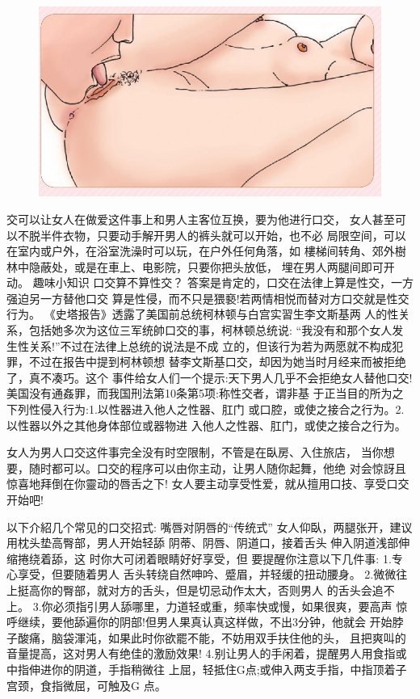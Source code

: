 \documentclass[12pt,UTF8]{ctexbook}
\begin{document}
\begin{figure}[htbp]
	\centering
	\includegraphics[width=0.7\linewidth]{19}
	\caption{}
	\label{fig:1}
\end{figure}

交可以让女人在做爱这件事上和男人主客位互换，要为他进行口交，
女人甚至可以不脱半件衣物，只要动手解开男人的裤头就可以开始，也不必
局限空间，可以在室内或户外，在浴室洗澡时可以玩，在户外任何角落，如
樓梯间转角、郊外樹林中隐蔽处，或是在車上、电影院，只要你把头放低，
埋在男人两腿间即可开动。
趣味小知识
口交算不算性交？
答案是肯定的，口交在法律上算是性交，一方强迫另一方替他口交
算是性侵，而不只是猥褻!若两情相悦而替对方口交就是性交行为。
《史塔报告》透露了美国前总统柯林顿与白宫实習生李文斯基两
人的性关系，包括她多次为这位三军统帥口交的事，柯林顿总统说:
“我没有和那个女人发生性关系!”不过在法律上总统的说法是不成
立的，但该行为若为两愿就不构成犯罪，不过在报告中提到柯林顿想
替李文斯基口交，却因为她当时月经来而被拒绝了，真不凑巧。这个
事件给女人们一个提示:天下男人几乎不会拒绝女人替他口交!
美国没有通姦罪，而我国刑法第10条第5项:称性交者，谓非基
于正当目的所为之下列性侵入行为:1.以性器进入他人之性器、肛门
或口腔，或使之接合之行为。2.以性器以外之其他身体部位或器物进
入他人之性器、肛门，或使之接合之行为。

女人为男人口交这件事完全没有时空限制，不管是在臥房、入住旅店，
当你想要，随时都可以。口交的程序可以由你主动，让男人随你起舞，他绝
对会惊訝且惊喜地拜倒在你靈动的唇舌之下!
女人要主动享受性爱，就从擅用口技、享受口交开始吧!

以下介紹几个常见的口交招式:
嘴唇对阴唇的“传统式”
女人仰臥，两腿张开，建议
用枕头垫高臀部，男人开始轻舔
阴蒂、阴唇、阴道口，接着舌头
伸入阴道浅部伸缩捲绕着舔，这
时你大可闭着眼睛好好享受，但
要提醒你注意以下几件事:
1.专心享受，但要随着男人
舌头转绕自然呻吟、蹙眉，并轻缓的扭动腰身。
2.微微往上挺高你的臀部，就对方的舌头，但是切忌动作太大，否则男人
的舌头会追不上。
3.你必须指引男人舔哪里，力道轻或重，频率快或慢，如果很爽，要高声
惊呼继续，要他舔遍你的阴部!但男人果真认真这样做，不出3分钟，他就会
开始脖子酸痛，脑袋渾沌，如果此时你欲罷不能，不妨用双手扶住他的头，
且把爽叫的音量提高，这对男人有绝佳的激励效果!
4.别让男人的手闲着，提醒男人用食指或中指伸进你的阴道，手指稍微往
上屈，轻抵住G点;或伸入两支手指，中指顶着子宫颈，食指微屈，可触及G
点。
\end{document}
